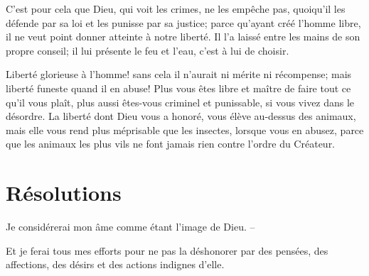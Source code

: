 \documentclass[instructions.tex]{subfiles}
\begin{document}
C’est pour cela que Dieu, qui voit les crimes, ne les empêche pas, quoiqu’il les défende par sa loi et les punisse par sa justice; parce qu’ayant créé l’homme libre, il ne veut point donner atteinte à notre liberté. Il l’a laissé entre les mains de son propre conseil; il lui présente le feu et l’eau, c’est à lui de choisir.
 
Liberté glorieuse à l’homme! sans cela il n’aurait ni mérite ni récompense; mais liberté funeste quand il en abuse! Plus vous êtes libre et maître de faire tout ce qu’il vous plaît, plus aussi êtes-vous criminel et punissable, si vous vivez dans le désordre. La liberté dont Dieu vous a honoré, vous élève au-dessus des animaux, mais elle vous rend plus méprisable que les insectes, lorsque vous en abusez, parce que les animaux les plus vils ne font jamais rien contre l’ordre du Créateur.
 
\section{Résolutions}
 
\primo Je considérerai mon âme comme étant l’image de Dieu. --
 
\secundo Et je ferai tous mes efforts pour ne pas la déshonorer par des pensées, des affections, des désirs et des actions indignes d’elle. 

 
\end{document}

